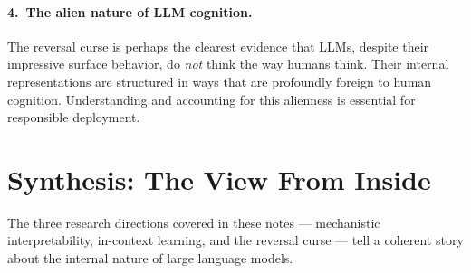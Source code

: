 \documentclass[11pt, a4paper]{article}
\theoremstyle{definition}
\theoremstyle{plain}
\begin{document}
\paragraph{4.\ The alien nature of LLM cognition.}
The reversal curse is perhaps the clearest evidence that LLMs, despite
their impressive surface behavior, do \emph{not} think the way humans
think.  Their internal representations are structured in ways that are
profoundly foreign to human cognition.  Understanding and accounting for
this alienness is essential for responsible deployment.


\section{Synthesis: The View From Inside}
\label{sec:synthesis}

The three research directions covered in these notes --- mechanistic
interpretability, in-context learning, and the reversal curse --- tell
a coherent story about the internal nature of large language models.

\begin{center}
\end{center}
\end{document}
